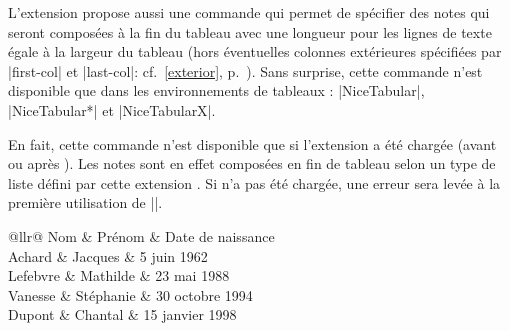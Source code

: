 \documentclass[dvipsnames]{article}
\begin{document}
L'extension  propose aussi une commande
 qui permet de spécifier des notes qui seront
composées à la fin du tableau avec une longueur pour les lignes de texte égale à
la largeur du tableau (hors éventuelles colonnes extérieures spécifiées par
|first-col| et |last-col|: cf.~\ref{exterior}, p.~\pageref{exterior}). Sans
surprise, cette commande n'est disponible que dans les environnements de
tableaux : |{NiceTabular}|, |{NiceTabular*}| et |{NiceTabularX}|.


 En fait, cette commande n'est disponible
que si l'extension  a été chargée (avant ou après
). Les notes sont en effet composées en fin de tableau selon un
type de liste défini par cette extension . Si  n'a
pas été chargée, une erreur sera levée à la première utilisation de
|\tabularnote|.

\medskip
\begin{Code}
\begin{NiceTabular}{@{}llr@{}}
\toprule \RowStyle{\bfseries}
Nom & Prénom & Date de naissance \\
\midrule
Achard\emph{}
& Jacques & 5 juin 1962 \\
Lefebvre\emph{}
& Mathilde & 23 mai 1988 \\
Vanesse & Stéphanie & 30 octobre 1994 \\
Dupont & Chantal & 15 janvier 1998 \\
\bottomrule
\end{NiceTabular}
\end{Code}
\end{document}
